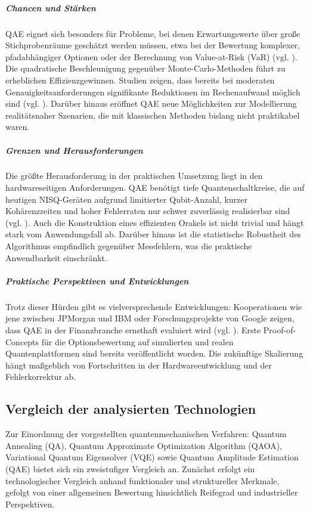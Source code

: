 \subparagraph{Chancen und Stärken}
QAE eignet sich besonders für Probleme, bei denen Erwartungswerte über große Stichprobenräume geschätzt werden müssen, etwa bei der Bewertung komplexer, pfadabhängiger Optionen oder der Berechnung von Value-at-Risk (VaR) (vgl. \cite{orus_quantum_2019}). Die quadratische Beschleunigung gegenüber Monte-Carlo-Methoden führt zu erheblichen Effizienzgewinnen. Studien zeigen, dass bereits bei moderaten Genauigkeitsanforderungen signifikante Reduktionen im Rechenaufwand möglich sind (vgl. \cite{rebentrost_quantum_2018, egger_quantum_2020}). Darüber hinaus eröffnet QAE neue Möglichkeiten zur Modellierung realitätsnaher Szenarien, die mit klassischen Methoden bislang nicht praktikabel waren.

\subparagraph{Grenzen und Herausforderungen}
Die größte Herausforderung in der praktischen Umsetzung liegt in den hardwareseitigen Anforderungen. QAE benötigt tiefe Quantenschaltkreise, die auf heutigen NISQ-Geräten aufgrund limitierter Qubit-Anzahl, kurzer Kohärenzzeiten und hoher Fehlerraten nur schwer zuverlässig realisierbar sind (vgl. \cite{bouland_prospects_2020, martin2022}). Auch die Konstruktion eines effizienten Orakels ist nicht trivial und hängt stark vom Anwendungsfall ab. Darüber hinaus ist die statistische Robustheit des Algorithmus empfindlich gegenüber Messfehlern, was die praktische Anwendbarkeit einschränkt.

\subparagraph{Praktische Perspektiven und Entwicklungen}
Trotz dieser Hürden gibt es vielversprechende Entwicklungen: Kooperationen wie jene zwischen JPMorgan und IBM oder Forschungsprojekte von Google zeigen, dass QAE in der Finanzbranche ernsthaft evaluiert wird (vgl. \cite{egger_quantum_2020}). Erste Proof-of-Concepts für die Optionsbewertung auf simulierten und realen Quantenplattformen sind bereits veröffentlicht worden. Die zukünftige Skalierung hängt maßgeblich von Fortschritten in der Hardwareentwicklung und der Fehlerkorrektur ab.

\subsection{Vergleich der analysierten Technologien}

Zur Einordnung der vorgestellten quantenmechanischen Verfahren: Quantum Annealing (QA), Quantum Approximate Optimization Algorithm (QAOA), Variational Quantum Eigensolver (VQE) sowie Quantum Amplitude Estimation (QAE) bietet sich ein zweistufiger Vergleich an. Zunächst erfolgt ein technologischer Vergleich anhand funktionaler und struktureller Merkmale, gefolgt von einer allgemeinen Bewertung hinsichtlich Reifegrad und industrieller Perspektiven.

